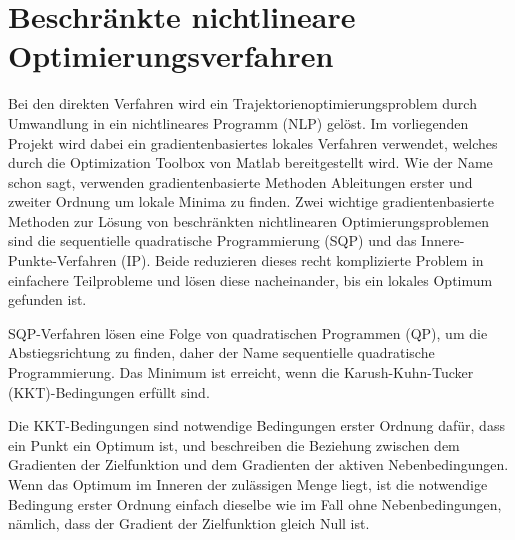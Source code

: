 



\section{Beschränkte nichtlineare Optimierungsverfahren}
Bei den direkten Verfahren wird ein Trajektorienoptimierungsproblem durch Umwandlung in ein nichtlineares Programm (NLP) gelöst. Im vorliegenden Projekt wird dabei ein gradientenbasiertes lokales Verfahren verwendet, welches durch die Optimization Toolbox von Matlab bereitgestellt wird. Wie der Name schon sagt, verwenden gradientenbasierte Methoden Ableitungen erster und zweiter Ordnung um lokale Minima zu finden. Zwei wichtige gradientenbasierte Methoden zur Lösung von beschränkten nichtlinearen Optimierungsproblemen sind die sequentielle quadratische Programmierung (SQP) und das Innere-Punkte-Verfahren (IP). Beide reduzieren dieses recht komplizierte Problem in einfachere Teilprobleme und lösen diese nacheinander, bis ein lokales Optimum gefunden ist.

SQP-Verfahren lösen eine Folge von quadratischen Programmen (QP), um die Abstiegsrichtung zu finden, daher der Name sequentielle quadratische Programmierung. Das Minimum ist erreicht, wenn die Karush-Kuhn-Tucker (KKT)-Bedingungen erfüllt sind.

Die KKT-Bedingungen sind notwendige Bedingungen erster Ordnung dafür, dass ein Punkt ein Optimum ist, und beschreiben die Beziehung zwischen dem Gradienten der Zielfunktion und dem Gradienten der aktiven Nebenbedingungen. Wenn das Optimum im Inneren der zulässigen Menge liegt, ist die notwendige Bedingung erster Ordnung einfach dieselbe wie im Fall ohne Nebenbedingungen, nämlich, dass der Gradient der Zielfunktion gleich Null ist.

